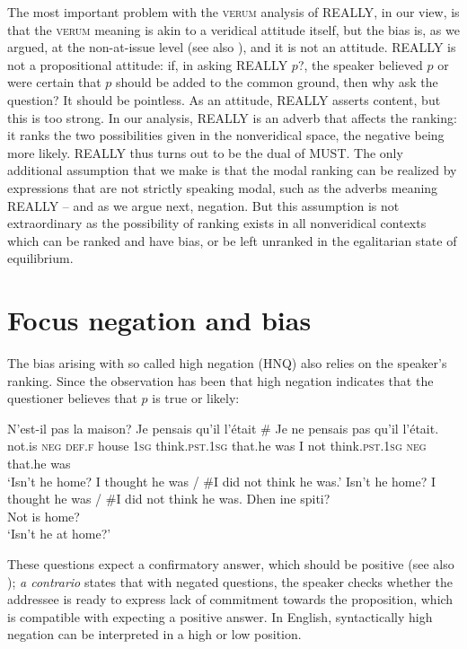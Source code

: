 \documentclass[output=paper,colorlinks,citecolor=brown]{langscibook}
\begin{document}
The most important problem with the \textsc{verum} analysis of \textsc{REALLY}, in our view, is that the \textsc{verum} meaning is akin to a veridical attitude itself, but the bias is, as we argued, at the non-at-issue level  (see also \citealt{liu2012, liu2021}), and it is not an attitude. \textsc{REALLY} is not a propositional attitude: if, in asking \textsc{REALLY} $p$?,  the speaker believed  $p$ or were certain that $p$ should be added to the common ground, then why ask the question? It should be pointless. As an attitude, \textsc{REALLY} asserts content, but this is too strong. In our analysis, \textsc{REALLY} is an adverb that affects the ranking: it ranks the two possibilities given in the nonveridical space, the negative being more likely. \textsc{REALLY} thus turns out to be the dual of \textsc{MUST}. The only additional assumption that we make is that the modal ranking can be realized by expressions that are not strictly speaking modal, such as the adverbs meaning \textsc{REALLY} --   and as we argue next, negation. But this assumption is not extraordinary as the possibility of ranking exists in all nonveridical contexts which can be ranked and have bias, or be left unranked in the egalitarian state of equilibrium.


 
 \section{Focus negation and bias } \label{sec:02:4}



The bias arising with so called high negation (HNQ)  also relies on the speaker's ranking. Since \citet{Ladd1981} the observation has been that  high negation indicates that the questioner believes  that $p$ is true or likely:

\ea 
\ea \gll N'est-il pas la maison? Je pensais qu'il l'était \# Je ne pensais pas qu'il l'était. \\
{not.is} \textsc{neg} \textsc{def.f} house \textsc{1sg} think\textsc{.pst.1sg} that.he {was} {} I not think\textsc{.pst.1sg} \textsc{neg} that.he was \\
\glt `Isn't he home? I thought he was / \#I did not think he was.'
\ex Isn't he home? I thought he was / \#I did not think he was.  \label{ex:02:Xaprim}
\ex \gll Dhen ine spiti? \\
Not is home? \\  
\glt `Isn't he at home?'
\z
\z


 These questions expect a confirmatory answer, which should be positive (see also \citealt{buring2000, romero2004, goodhue2018}); \textit{a contrario} \citet{krifka2015SALT} states that with negated questions, the speaker checks whether the addressee is ready to express lack of commitment  towards the proposition, which is compatible with expecting a positive answer.  In English,  syntactically high negation can be interpreted in a high or low position. 
\end{document}
